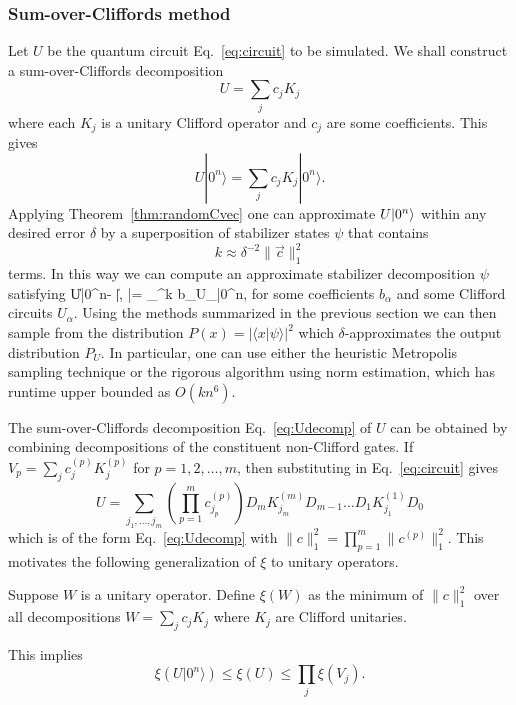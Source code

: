 \subsubsection{Sum-over-Cliffords method}
\label{sec:sum_cliffords}
Let $U$ be the quantum circuit Eq.~\eqref{eq:circuit} to be simulated.  We shall construct a sum-over-Cliffords decomposition
\begin{equation}
U=\sum_j c_j K_j
\label{eq:Udecomp}
\end{equation}
where each $K_j$ is a unitary Clifford operator and $c_j$ are some coefficients. This gives
\begin{equation}
U|0^n\rangle=\sum_j c_j K_j|0^n\rangle.
\label{eq:Vphi}
\end{equation}
Applying  Theorem~\ref{thm:randomCvec} one can approximate $U|0^n\rangle$ within any desired error $\delta$ by a 
superposition of stabilizer states $\psi$ that contains  
\begin{equation}
k \approx \delta^{-2}  \| \vec{c} \|_1^2
\label{eq:chisim}
\end{equation}
terms.  In this way we can compute an approximate stabilizer decomposition $\psi$ satisfying
\be
\label{approxU1}
\|U|0^n\ra - |\psi\ra\|\le \delta, \qquad |\psi\ra = \sum_{}^k b_\alpha U_\alpha |0^n\ra ,
\ee
for some coefficients $b_\alpha$ and some Clifford circuits $U_\alpha$. Using the methods summarized in the previous section we can then sample from the distribution $P(x)=|\langle x|\psi\rangle|^2$ which $\delta$-approximates the output distribution $P_U$. In particular, one can use either the heuristic Metropolis sampling technique or the rigorous algorithm using norm estimation, which has runtime upper bounded as $O(kn^6)$.


The sum-over-Cliffords decomposition Eq.~\eqref{eq:Udecomp} of $U$ can be obtained by combining decompositions of the constituent non-Clifford gates. If $V_p=\sum_{j} c_j^{(p)} K_j^{(p)}$ for $p=1,2,\ldots, m$, then substituting in Eq.~\eqref{eq:circuit} gives
\[
U=\sum_{j_1,\ldots,j_m} \left(\prod_{p=1}^{m} c_{j_p}^{(p)}\right) D_m K_{j_m}^{(m)}D_{m-1}\ldots D_1 K^{(1)}_{j_1} D_0
\]
which is of the form Eq.~\eqref{eq:Udecomp} with $\|c\|_1^2=\prod_{p=1}^{m} \|c^{(p)}\|_1^2$.  This motivates the following generalization of $\xi$ to unitary operators.

\begin{dfn}
	Suppose $W$ is a unitary operator. Define $\xi(W)$ as the minimum of $\| c \|^2_1$ over all
	 decompositions  $W=\sum_j c_j K_j$ where $K_j$ are Clifford unitaries.
\end{dfn}
\noindent
This implies 
\begin{equation}
\xi(U|0^n\rangle)\leq \xi(U) \leq \prod_j \xi(V_j).
\label{eq:cstarU}
\end{equation}

